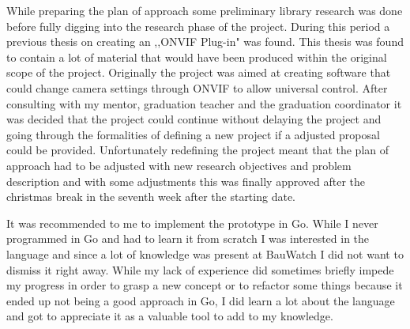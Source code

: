 While preparing the plan of approach some preliminary library research was done before fully digging into the research phase of the project.
During this period a previous thesis on creating an ,,ONVIF Plug-in" \cite{kesteloo_onvif_2016} was found.
This thesis was found to contain a lot of material that would have been produced within the original scope of the project.
Originally the project was aimed at creating software that could change camera settings through ONVIF to allow universal control.
After consulting with my mentor, graduation teacher and the graduation coordinator it was decided that the project could continue without delaying the project and going through the formalities of defining a new project if a adjusted proposal could be provided.
Unfortunately redefining the project meant that the plan of approach had to be adjusted with new research objectives and problem description and with some adjustments this was finally approved after the christmas break in the seventh week after the starting date.

It was recommended to me to implement the prototype in Go.
While I never programmed in Go and had to learn it from scratch I was interested in the language and since a lot of knowledge was present at BauWatch I did not want to dismiss it right away.
While my lack of experience did sometimes briefly impede my progress in order to grasp a new concept or to refactor some things because it ended up not being a good approach in Go, I did learn a lot about the language and got to appreciate it as a valuable tool to add to my knowledge.

